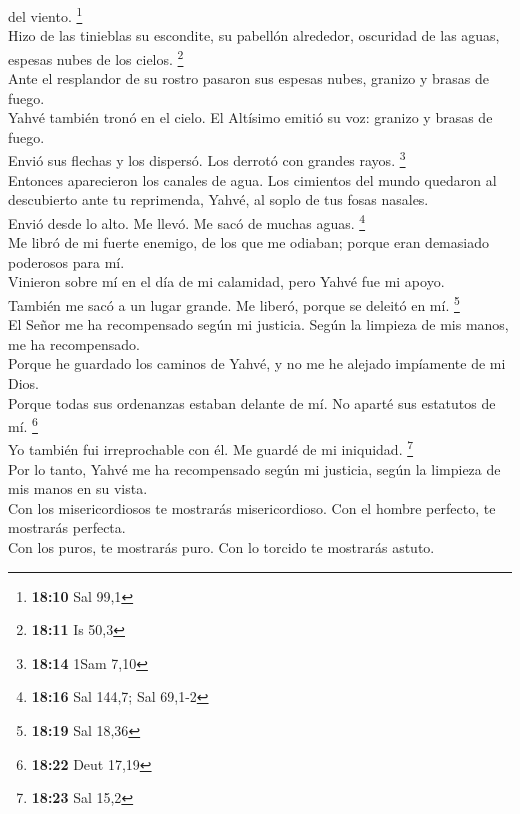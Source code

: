 del viento. \footnote{\textbf{18:10} Sal 99,1}\\
 Hizo de las tinieblas su escondite, su pabellón
alrededor, oscuridad de las aguas, espesas nubes de los cielos.
\footnote{\textbf{18:11} Is 50,3}\\
 Ante el resplandor de su rostro pasaron sus espesas
nubes, granizo y brasas de fuego.\\
 Yahvé también tronó en el cielo. El Altísimo emitió su
voz: granizo y brasas de fuego.\\
 Envió sus flechas y los dispersó. Los derrotó con
grandes rayos. \footnote{\textbf{18:14} 1Sam 7,10}\\
 Entonces aparecieron los canales de agua. Los cimientos
del mundo quedaron al descubierto ante tu reprimenda, Yahvé, al soplo de
tus fosas nasales.\\
 Envió desde lo alto. Me llevó. Me sacó de muchas aguas.
\footnote{\textbf{18:16} Sal 144,7; Sal 69,1-2}\\
 Me libró de mi fuerte enemigo, de los que me odiaban;
porque eran demasiado poderosos para mí.\\
 Vinieron sobre mí en el día de mi calamidad, pero Yahvé
fue mi apoyo.\\
 También me sacó a un lugar grande. Me liberó, porque se
deleitó en mí. \footnote{\textbf{18:19} Sal 18,36}\\
 El Señor me ha recompensado según mi justicia. Según la
limpieza de mis manos, me ha recompensado.\\
 Porque he guardado los caminos de Yahvé, y no me he
alejado impíamente de mi Dios.\\
 Porque todas sus ordenanzas estaban delante de mí. No
aparté sus estatutos de mí. \footnote{\textbf{18:22} Deut 17,19}\\
 Yo también fui irreprochable con él. Me guardé de mi
iniquidad. \footnote{\textbf{18:23} Sal 15,2}\\
 Por lo tanto, Yahvé me ha recompensado según mi
justicia, según la limpieza de mis manos en su vista.\\
 Con los misericordiosos te mostrarás misericordioso. Con
el hombre perfecto, te mostrarás perfecta.\\
 Con los puros, te mostrarás puro. Con lo torcido te
mostrarás astuto.\\
